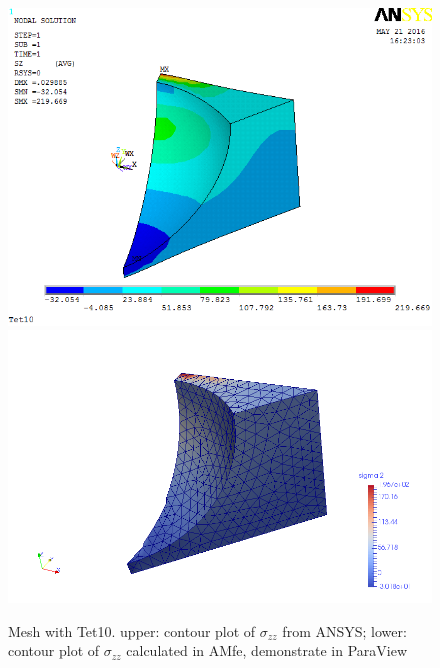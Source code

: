 \begin{figure}[htbp]
	\begin{center}
		\includegraphics[width=13cm,clip]{Tet10_Szz.png} 		
		\includegraphics[width=13cm,clip]{Tet10_Szz_P.png} 		
		\caption{Mesh with Tet10. upper: contour plot of $\sigma_{zz}$ from ANSYS; lower: contour plot of $\sigma_{zz}$ calculated in AMfe, demonstrate in ParaView} \label{fig: Tet10_Szz}
	\end{center}
\end{figure}
\clearpage 


